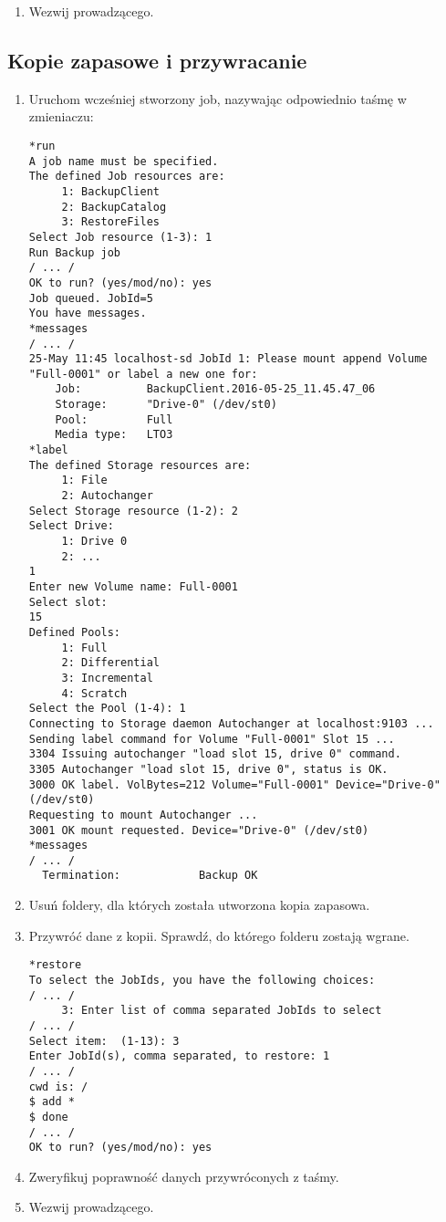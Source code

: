 \documentclass[polish]{article}
\begin{document}
\begin{enumerate}
\item Wezwij prowadzącego.

\end{enumerate}


\subsection*{Kopie zapasowe i przywracanie}

\begin{enumerate}

\item Uruchom wcześniej stworzony job, nazywając odpowiednio taśmę w zmieniaczu:
\begin{verbatim}
*run
A job name must be specified.
The defined Job resources are:
     1: BackupClient
     2: BackupCatalog
     3: RestoreFiles
Select Job resource (1-3): 1
Run Backup job
/ ... /
OK to run? (yes/mod/no): yes
Job queued. JobId=5
You have messages.
*messages
/ ... /
25-May 11:45 localhost-sd JobId 1: Please mount append Volume "Full-0001" or label a new one for:
    Job:          BackupClient.2016-05-25_11.45.47_06
    Storage:      "Drive-0" (/dev/st0)
    Pool:         Full
    Media type:   LTO3
*label
The defined Storage resources are:
     1: File
     2: Autochanger
Select Storage resource (1-2): 2
Select Drive:
     1: Drive 0
     2: ...
1
Enter new Volume name: Full-0001
Select slot:
15
Defined Pools:
     1: Full
     2: Differential
     3: Incremental
     4: Scratch
Select the Pool (1-4): 1
Connecting to Storage daemon Autochanger at localhost:9103 ...
Sending label command for Volume "Full-0001" Slot 15 ...
3304 Issuing autochanger "load slot 15, drive 0" command.
3305 Autochanger "load slot 15, drive 0", status is OK.
3000 OK label. VolBytes=212 Volume="Full-0001" Device="Drive-0" (/dev/st0)
Requesting to mount Autochanger ...
3001 OK mount requested. Device="Drive-0" (/dev/st0)
*messages
/ ... /
  Termination:            Backup OK
\end{verbatim}

\item Usuń foldery, dla których została utworzona kopia zapasowa.

\item Przywróć dane z kopii. Sprawdź, do którego folderu zostają wgrane.

\begin{verbatim}
*restore
To select the JobIds, you have the following choices:
/ ... /
     3: Enter list of comma separated JobIds to select
/ ... /
Select item:  (1-13): 3
Enter JobId(s), comma separated, to restore: 1
/ ... /
cwd is: /
$ add *
$ done
/ ... /
OK to run? (yes/mod/no): yes
\end{verbatim}

\item Zweryfikuj poprawność danych przywróconych z taśmy.

\item Wezwij prowadzącego.

\end{enumerate}
\end{document}
